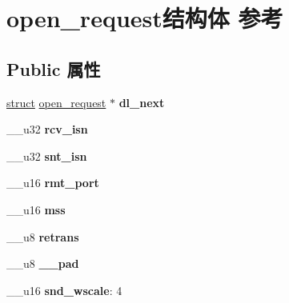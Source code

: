 \hypertarget{structopen__request}{}\section{open\+\_\+request结构体 参考}
\label{structopen__request}
\subsection*{Public 属性}
\begin{DoxyCompactItemize}
\item 
\mbox{\label{structopen__request_a87971b12acd36cc7a9594d156c9e6dec}} 
\hyperlink{interfacestruct}{struct} \hyperlink{structopen__request}{open\+\_\+request} $\ast$ {\bfseries dl\+\_\+next}
\item 
\mbox{\label{structopen__request_a10464d881c7f1b88f422ec677a496369}} 
\+\_\+\+\_\+u32 {\bfseries rcv\+\_\+isn}
\item 
\mbox{\label{structopen__request_a1e662424686997ba01547c6fab599ea5}} 
\+\_\+\+\_\+u32 {\bfseries snt\+\_\+isn}
\item 
\mbox{\label{structopen__request_a34413cc561e959285970cf629e2e9a43}} 
\+\_\+\+\_\+u16 {\bfseries rmt\+\_\+port}
\item 
\mbox{\label{structopen__request_afe8b1d355aa7a46c00583d843df17c9b}} 
\+\_\+\+\_\+u16 {\bfseries mss}
\item 
\mbox{\label{structopen__request_ae2be5e6c5a6088062d541def5823387b}} 
\+\_\+\+\_\+u8 {\bfseries retrans}
\item 
\mbox{\label{structopen__request_a71682cde81fb64460b0e2b59dc0ef608}} 
\+\_\+\+\_\+u8 {\bfseries \+\_\+\+\_\+pad}
\item 
\mbox{\label{structopen__request_a0b2fd9dc9cae8cfabeb9759910bef77b}} 
\+\_\+\+\_\+u16 {\bfseries snd\+\_\+wscale}\+: 4
\item 
\mbox{\label{structopen__request_a28d0a130e10a203ace242fee5e95fe8d}} 

\end{DoxyCompactItemize}
